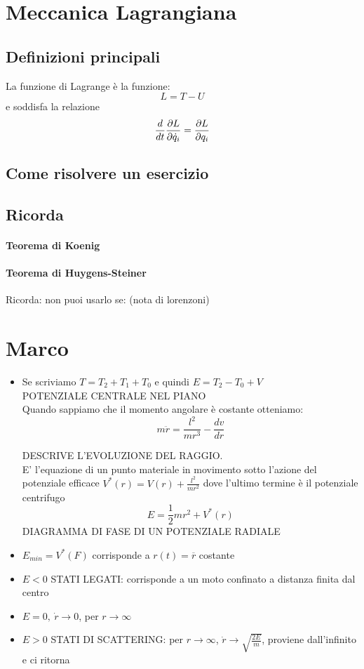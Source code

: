 \documentclass[a4paper,12pt]{article}
\begin{document}
\section{Meccanica Lagrangiana}
\subsection{Definizioni principali}
La funzione di Lagrange è la funzione:
$$ L = T - U $$
e soddisfa la relazione
$${d \over dt}\dfrac{\partial L}{\partial\dot{q}_i} = \dfrac{\partial L}{\partial q_i}$$
\subsection{Come risolvere un esercizio}

\subsection{Ricorda}
\paragraph{Teorema di Koenig}

\paragraph{Teorema di Huygens-Steiner}
Ricorda: non puoi usarlo se: (nota di lorenzoni)

\section{Marco}	
\begin{itemize}


\item Se scriviamo $T=T_2+T_1+T_0$ e quindi $E=T_2-T_0+V$ \\
POTENZIALE CENTRALE NEL PIANO \\
Quando sappiamo che il momento angolare è costante otteniamo:
\begin{displaymath}
m\ddot{r}=\frac{l^2}{mr^3}-\frac{dv}{dr}
\end{displaymath}

DESCRIVE L'EVOLUZIONE DEL RAGGIO.\\
E' l'equazione di un punto materiale in movimento sotto l'azione del potenziale efficace $V^*(r)=V(r)+\frac{l^2}{mr^2}$ dove l'ultimo termine è il potenziale centrifugo
\begin{displaymath}
E=\frac{1}{2}mr^2 + V^*(r)
\end{displaymath}
DIAGRAMMA DI FASE DI UN POTENZIALE RADIALE
\item $E_{min}=V^*(F)$ corrisponde a $r(t)=\overline{r}$ costante
\item $E<0$ STATI LEGATI: corrisponde a un moto confinato a distanza finita dal centro
\item $E=0,\ \dot{r}\to0$, per $r\to\infty$
\item $E>0$ STATI DI SCATTERING: per $r\to\infty$, $\dot{r}\to\sqrt{\frac{2E}{m}}$, proviene dall'infinito e ci ritorna
\end{itemize}
\newtheorem{prop}{Proposizione}[section]
\end{document}
